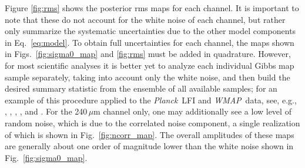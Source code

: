 \documentclass{aa}
\def\Planck{\textit{Planck}}
\def\WMAP{\textit{WMAP}}
\newcommand{\cosmoglobe}{\textsc{Cosmoglobe}}
\begin{document}
Figure \ref{fig:rms} shows the posterior rms maps for each channel. It
is important to note that these do not account for the white noise of
each channel, but rather only summarize the systematic uncertainties
due to the other model components in Eq.~\eqref{eq:model}. To obtain
full uncertainties for each channel, the maps shown in
Figs.~\ref{fig:sigma0_map} and \ref{fig:rms} must be added in
quadrature. However, for most scientific analyses it is better yet to
analyze each individual Gibbs map sample separately, taking into
account only the white noise, and then build the desired summary
statistic from the ensemble of all available samples; for an example
of this procedure applied to the \Planck\ LFI and \WMAP\ data, see,
e.g., \citet{bp10}, \citet{bp11}, \citet{bp12}, \citet{bp13}, and
\citet{watts2023_dr1}.  For the 240\,$\mu$m channel only, one may
additionally see a low level of random noise, which is due to the
correlated noise component, a single realization of which is shown in
Fig.~\ref{fig:ncorr_map}. The overall amplitudes of these maps are
generally about one order of magnitude lower than the white noise
shown in Fig.~\ref{fig:sigma0_map}.






\end{document}
